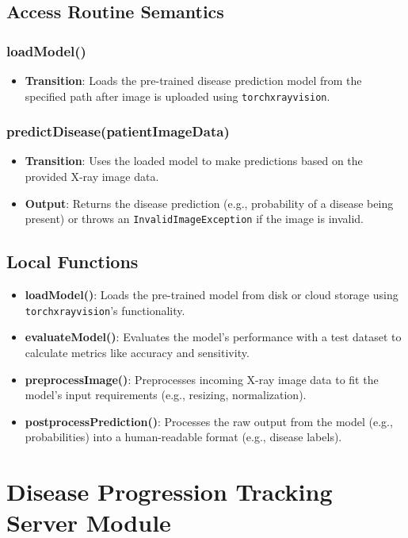 \documentclass[12pt, titlepage]{article}
\begin{document}
\subsection{Access Routine Semantics}
\subsubsection{loadModel()}
\begin{itemize}
    \item \textbf{Transition}: Loads the pre-trained disease prediction model from the specified path after image is uploaded using \texttt{torchxrayvision}.
\end{itemize}

\subsubsection{predictDisease(patientImageData)}
\begin{itemize}
    \item \textbf{Transition}: Uses the loaded model to make predictions based on the provided X-ray image data.
    \item \textbf{Output}: Returns the disease prediction (e.g., probability of a disease being present) or throws an \texttt{InvalidImageException} if the image is invalid.
\end{itemize}

\subsection{Local Functions}
\begin{itemize}
    \item \textbf{loadModel()}: Loads the pre-trained model from disk or cloud storage using \texttt{torchxrayvision}'s functionality.
    \item \textbf{evaluateModel()}: Evaluates the model’s performance with a test dataset to calculate metrics like accuracy and sensitivity.
    \item \textbf{preprocessImage()}: Preprocesses incoming X-ray image data to fit the model's input requirements (e.g., resizing, normalization).
    \item \textbf{postprocessPrediction()}: Processes the raw output from the model (e.g., probabilities) into a human-readable format (e.g., disease labels).
\end{itemize}

\section{Disease Progression Tracking Server Module}
\end{document}
